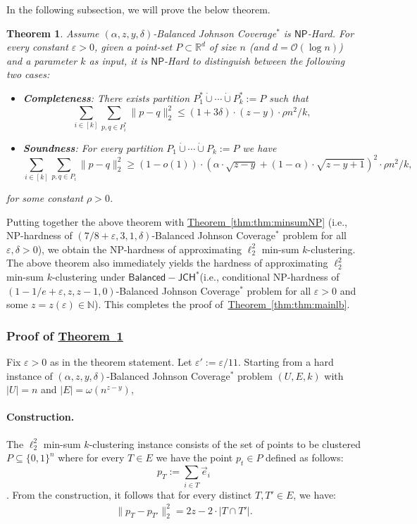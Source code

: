 \documentclass[10pt,a4paper]{amsart}
\newtheorem{theorem}{Theorem}[section]
\newcommand{\namedref}[2]{\hyperref[#2]{#1~\ref*{#2}}}
\newcommand{\thmlab}[1]{\label{thm:#1}}
\newcommand{\thmref}[1]{\namedref{Theorem}{thm:#1}}
\renewcommand{\O}[1]{\ensuremath{\mathcal{O}\left(#1\right)}}
\newcommand{\eps}{\varepsilon}
\newcommand{\JCHD}{$\mathsf{JCH}^*$\xspace}
\newcommand{\JCHDB}{$\mathsf{Balanced-JCH}^*$\xspace}
\newcommand{\jcdb}{Balanced Johnson Coverage$^*$\xspace}
\newcommand{\NP}{$\mathsf{NP}$\xspace}
\begin{document}
In the following subsection, we will prove the below theorem. 

\begin{theorem}
\thmlab{thm:mainreduction}
Assume $(\alpha, z, y,\delta)$-\jcdb is \NP-Hard. 
For every constant $\varepsilon>0$,  given a point-set $P\subset \mathbb{R}^{d}$ of size $n$ (and $d=\O{\log n}$) and a parameter $k$ as input, it is \NP-Hard to distinguish between the following two cases:
\begin{itemize}
\item \textbf{\emph{Completeness}}:  
There exists partition $P_1^*\dot\cup\cdots \dot\cup P_k^*:=P$  such that $$\sum_{i\in [k]}\sum_{p,q\in P_i^*}\|p-q\|_2^2\le (1+3\delta)\cdot (z-y)\cdot \rho n^2/k,$$
\item \textbf{\emph{Soundness}}: For every partition $P_1\dot\cup\cdots \dot\cup P_k:=P$  we have  $$\sum_{i\in [k]}\sum_{p,q\in P_i}\|p-q\|_2^2\ge (1-o(1))\cdot \left(\alpha\cdot \sqrt{z-y}+(1-\alpha)\cdot \sqrt{z-y+1}\right)^{2} \cdot \rho n^2/k,$$
\end{itemize}
for some constant $\rho>0$.
\end{theorem}

Putting together the above theorem with \thmref{thm:minsumNP} (i.e., NP-hardness of $(7/8+\varepsilon,3,1,\delta)$-\jcdb problem for all $\varepsilon,\delta>0$), we obtain the NP-hardness of approximating $\ell_2^2$ min-sum $k$-clustering. The above theorem also immediately yields the hardness of approximating $\ell_2^2$ min-sum $k$-clustering under \JCHDB (i.e., conditional NP-hardness of $(1-1/e+\varepsilon,z,z-1,0)$-\jcdb problem for all $\varepsilon>0$ and some $z=z(\varepsilon)\in\mathbb{N}$). This completes the proof of~\thmref{thm:mainlb}.


\subsubsection{Proof of \texorpdfstring{\thmref{thm:mainreduction}}{Theorem (Main Reduction)}}
Fix $\varepsilon>0$ as in the theorem statement.  Let $\eps':=\eps/11$. Starting from a hard instance of $\left( \alpha, z, y, \delta \right)$-\jcdb problem $(U,E,k)$ with $|U| = n$ and $|E| = \omega(n^{z-y})$, %



\paragraph{Construction.} 
The $\ell_2^2$ min-sum $k$-clustering instance consists of the set of points to be clustered $P\subseteq \{0,1\}^{n}$ where for every $T\in E$ we have the point $p_t\in P$ defined as follows:
\[p_T:=\sum_{i\in T}\vec{e}_i\].
From the construction, it follows that for every distinct $T,T'\in E$, we have:
\begin{align}\label{eqsub}
 \|p_T-p_{T'}\|_2^2= 2z -2\cdot |T\cap T'|. 
\end{align} 
\end{document}

